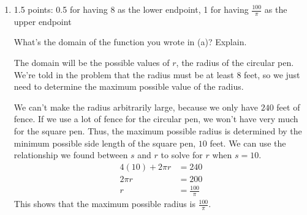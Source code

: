 \documentclass{article}
\begin{document}
\begin{enumerate}
\begin{enumerate}
\begin{solution}
      Let's call the radius of the circular pen $r$ and the side length of the
      square pen $s$. Let's first write down a formula for the total area. If
      we call the total area $A_\text{total}$, then
      \[A_\text{total} = A_\text{square} + A_\text{circle}\]
      where $A_\text{square}$ is the area of the square pen
      and $A_\text{circle}$ is the area of the circular pen. We know
      that $A_\text{square}=s^2$ and $A_\text{circle}=\pi r^2$, so we can
      substitute these in to our formula.
      \[A_\text{total} = s^2 + \pi r^2\]
      Now we need to express this as a function of just $r$. To do so, we need to
      express $s$ in terms of $r$. We can use the fact that the farmer has 240 feet
      of fence. The amount of fence he'll need for the square pen is $4s$, and the
      amount of fence he'll need for the circular pen is $2\pi r$.
      \begin{align*}
          4s + 2\pi r &= 240 \\
          4s &= 240 - 2\pi r \\
          s &= 60 - \tfrac{1}{2}\pi r
      \end{align*}
      Now that we have an expression for $s$ in terms of $r$, we can substitute
      this into our formula for the total area to get a function of $r$.
      \[A_\text{total} = (60 - \tfrac{1}{2}\pi r)^2 + \pi r^2\]
    \end{solution}

  \item

    \begin{grading}
      1.5 points: 0.5 for having 8 as the lower endpoint, 1 for having $\frac{100}{\pi}$ as the upper endpoint
    \end{grading}

    \begin{problem}[\nstretch{0.5}]
      What's the domain of the function you wrote in (a)? Explain. 
    \end{problem}

    \begin{solution}
      The domain will be the possible values of $r$, the radius of the circular pen.
      We're told in the problem that the radius must be at least $8$ feet, so we just
      need to determine the maximum possible value of the radius.
      
      We can't
      make the radius arbitrarily large, because we only have $240$ feet of fence.
      If we use a lot of fence for the circular pen, we won't have very much for the
      square pen. Thus, the maximum possible radius is determined by the minimum possible
      side length of the square pen, $10$ feet. We can use the relationship we found between $s$ and $r$ to solve for $r$ when $s=10$. 
      \begin{align*}
          4(10) + 2\pi r &= 240 \\
          2\pi r &= 200 \\
          r &= \frac{100}{\pi}
      \end{align*}
      This shows that the maximum possible radius is $\frac{100}{\pi}$.


\end{solution}
\end{enumerate}
\end{enumerate}
\end{document}
